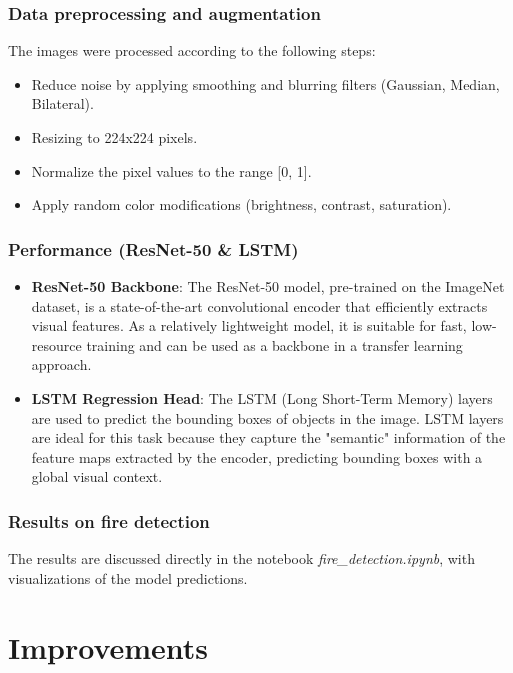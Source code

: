 \documentclass{article}
\begin{document}
\subsubsection{Data preprocessing and augmentation}

The images were processed according to the following steps:

\begin{itemize}
    \item Reduce noise by applying smoothing and blurring filters (Gaussian, Median, Bilateral).
    \item Resizing to 224x224 pixels.
    \item Normalize the pixel values to the range [0, 1].
    \item Apply random color modifications (brightness, contrast, saturation).
\end{itemize}

\subsubsection{Performance (ResNet-50 \& LSTM)}

\begin{itemize}
    \item \textbf{ResNet-50 Backbone}: The ResNet-50 model, pre-trained on the ImageNet dataset, is a state-of-the-art convolutional encoder that efficiently extracts visual features. As a relatively lightweight model, it is suitable for fast, low-resource training and can be used as a backbone in a transfer learning approach.
    \item \textbf{LSTM Regression Head}: The LSTM (Long Short-Term Memory) layers are used to predict the bounding boxes of objects in the image. LSTM layers are ideal for this task because they capture the "semantic" information of the feature maps extracted by the encoder, predicting bounding boxes with a global visual context.
\end{itemize}

\subsubsection{Results on fire detection}

The results are discussed directly in the notebook \textit{fire\_detection.ipynb}, with visualizations of the model predictions.

\newpage

\section{Improvements}
\end{document}
